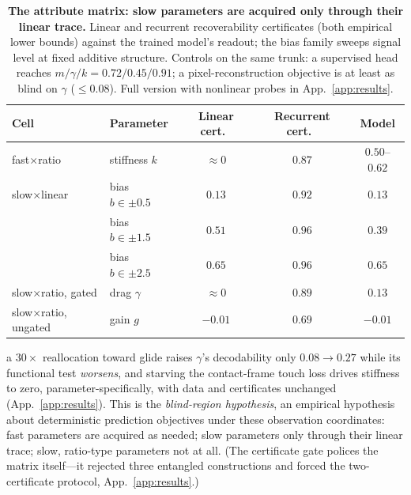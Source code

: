 \documentclass{article} %
\begin{document}
\begin{table}[t]
\caption{\textbf{The attribute matrix: slow parameters are acquired only
through their linear trace.} Linear and recurrent recoverability
certificates (both empirical lower bounds) against the trained model's
readout; the bias family sweeps signal level at fixed additive structure.
Controls on the same trunk: a supervised head reaches
$m/\gamma/k = 0.72/0.45/0.91$; a pixel-reconstruction objective is at least
as blind on $\gamma$ ($\le 0.08$). Full version with nonlinear probes in
App.~\ref{app:results}.}
\label{tab:matrix}
\begin{center}
\small
\begin{tabular}{llccc}
\toprule
\rowcolor{tabhead} Cell & Parameter & Linear cert.\ & Recurrent cert.\ & Model \\
\midrule
fast$\times$ratio & stiffness $k$ & ${\approx}0$ & $0.87$ & $0.50$--$0.62$ \\
slow$\times$linear & bias $b \in \pm0.5$ & $0.13$ & $0.92$ & $0.13$ \\
 & bias $b \in \pm1.5$ & $0.51$ & $0.96$ & $0.39$ \\
 & bias $b \in \pm2.5$ & $0.65$ & $0.96$ & $0.65$ \\
slow$\times$ratio, gated & drag $\gamma$ & ${\approx}0$ & $0.89$ & $0.13$ \\
slow$\times$ratio, ungated & gain $g$ & $-0.01$ & $0.69$ & $-0.01$ \\
\bottomrule
\end{tabular}
\end{center}
\end{table}
a $30\times$ reallocation toward glide raises $\gamma$'s decodability only
$0.08 \rightarrow 0.27$ while its functional test \emph{worsens}, and
starving the contact-frame touch loss drives stiffness to zero,
parameter-specifically, with data and certificates unchanged
(App.~\ref{app:results}). This is the \emph{blind-region hypothesis}, an
empirical hypothesis about deterministic prediction objectives under these
observation coordinates: fast parameters are acquired as needed; slow
parameters only through their linear trace; slow, ratio-type parameters not
at all. (The certificate gate polices the matrix itself---it rejected three
entangled constructions and forced the two-certificate protocol,
App.~\ref{app:results}.)
\end{document}
